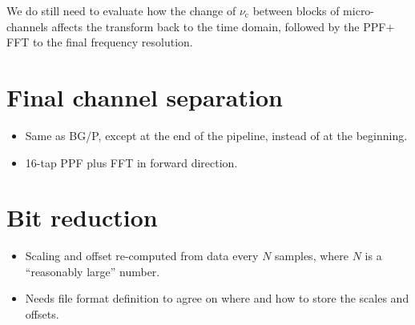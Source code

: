 \documentclass[a4paper,twoside]{article}
\newcommand{\bgp}{BG/P\xspace}
\begin{document}
We do still need to evaluate how the change of $\nu_\mathrm{c}$
between blocks of micro-channels affects the transform back to the
time domain, followed by the PPF$+$FFT to the final frequency
resolution. 


%
%
%


%
%

\section{Final channel separation}
\label{sec:final-channel-separation}

\begin{itemize}
\item Same as \bgp, except at the end of the pipeline, instead of at the
beginning.
\item 16-tap PPF plus FFT in forward direction.
\end{itemize}


%
%
%




%
%
\section{Bit reduction}
\label{sec:bit-reduction}

\begin{itemize}
\item Scaling and offset re-computed from data every $N$ samples,
  where $N$ is a ``reasonably large'' number.
\item Needs file format definition to agree on where and how to store
  the scales and offsets.
\end{itemize}







\printindex
\end{document}
